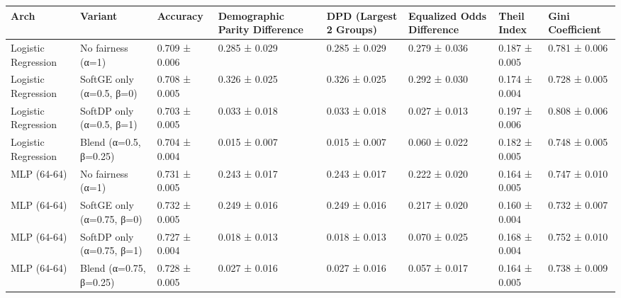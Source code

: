 \begin{tabular}{llllllll}
\toprule
Arch & Variant & Accuracy & Demographic Parity Difference & DPD (Largest 2 Groups) & Equalized Odds Difference & Theil Index & Gini Coefficient \\
\midrule
Logistic Regression & No fairness (α=1) & 0.709 ± 0.006 & 0.285 ± 0.029 & 0.285 ± 0.029 & 0.279 ± 0.036 & 0.187 ± 0.005 & 0.781 ± 0.006 \\
Logistic Regression & SoftGE only (α=0.5, β=0) & 0.708 ± 0.005 & 0.326 ± 0.025 & 0.326 ± 0.025 & 0.292 ± 0.030 & 0.174 ± 0.004 & 0.728 ± 0.005 \\
Logistic Regression & SoftDP only (α=0.5, β=1) & 0.703 ± 0.005 & 0.033 ± 0.018 & 0.033 ± 0.018 & 0.027 ± 0.013 & 0.197 ± 0.006 & 0.808 ± 0.006 \\
Logistic Regression & Blend (α=0.5, β=0.25) & 0.704 ± 0.004 & 0.015 ± 0.007 & 0.015 ± 0.007 & 0.060 ± 0.022 & 0.182 ± 0.005 & 0.748 ± 0.005 \\
MLP (64-64) & No fairness (α=1) & 0.731 ± 0.005 & 0.243 ± 0.017 & 0.243 ± 0.017 & 0.222 ± 0.020 & 0.164 ± 0.005 & 0.747 ± 0.010 \\
MLP (64-64) & SoftGE only (α=0.75, β=0) & 0.732 ± 0.005 & 0.249 ± 0.016 & 0.249 ± 0.016 & 0.217 ± 0.020 & 0.160 ± 0.004 & 0.732 ± 0.007 \\
MLP (64-64) & SoftDP only (α=0.75, β=1) & 0.727 ± 0.004 & 0.018 ± 0.013 & 0.018 ± 0.013 & 0.070 ± 0.025 & 0.168 ± 0.004 & 0.752 ± 0.010 \\
MLP (64-64) & Blend (α=0.75, β=0.25) & 0.728 ± 0.005 & 0.027 ± 0.016 & 0.027 ± 0.016 & 0.057 ± 0.017 & 0.164 ± 0.005 & 0.738 ± 0.009 \\
\bottomrule
\end{tabular}
